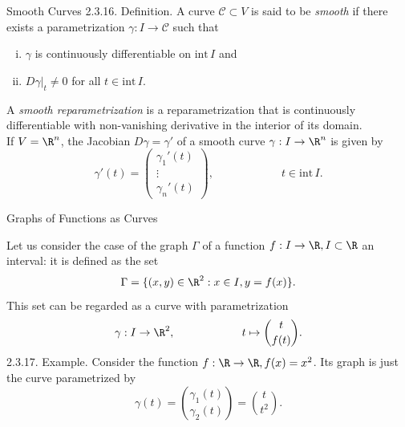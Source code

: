 \documentclass[smaller,hyperref={CJKbookmarks=true}]{beamer}
\begin{document}
\begin{frame}[c]{Smooth Curves}
\alert{2.3.16. Definition.} A curve $\mathcal{C}\subset V$ is said to be \emph{smooth} if there exists a parametrization $\gamma:I\to\mathcal{C}$ such that
\begin{enumerate}[(i)]
  \item $\gamma$ is continuously dif{}ferentiable on $\text{int}\,I$ and
  \item $D\gamma|_t\neq0$ for all $t\in\text{int}\,I$.
\end{enumerate}
A \emph{smooth reparametrization} is a reparametrization that is continuously
dif{}ferentiable with non-vanishing derivative in the interior of its domain.\\[6pt]
If $V=\R^n$, the Jacobian $D\gamma=\gamma'$ of a smooth curve $\gamma:I\to\R^n$ is given by
\[\gamma'(t)=\begin{pmatrix}
               \gamma_1'(t) \\
               \vdots \\
               \gamma_n'(t)
             \end{pmatrix},\qquad\qquad\qquad
             t\in\text{int}\,I.\]
\end{frame}
\begin{frame}[t]{Graphs of Functions as Curves}
\begin{spacing}{1.1}
Let us consider the case of the graph $\Gamma$ of a function $f:I\to\R,I\subset\R$ an interval: it is defined as the set
\[\Gamma=\{(x,y)\in\R^2:x\in I,y=f(x)\}.\]
This set can be regarded as a curve with parametrization
\[\gamma:I\to\R^2,\qquad\qquad\qquad t\mapsto\binom{t}{f(t)}.\]
\alert{2.3.17. Example.} Consider the function $f:\R\to\R,f(x)=x^2$. Its graph is just the curve parametrized by
\[\gamma(t)=\binom{\gamma_1(t)}{\gamma_2(t)}=\binom{t}{t^2}.\]
\end{spacing}
\end{frame}
\end{document}

